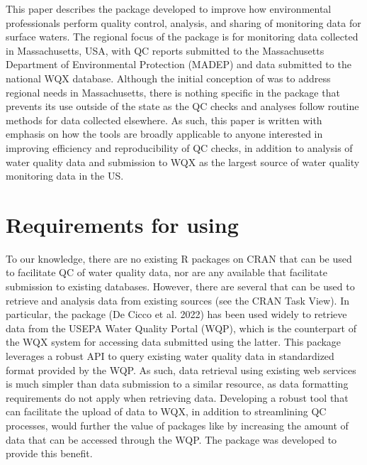 This paper describes the  package developed to improve how environmental professionals perform quality control, analysis, and sharing of monitoring data for surface waters. The regional focus of the package is for monitoring data collected in Massachusetts, USA, with QC reports submitted to the Massachusetts Department of Environmental Protection (MADEP) and data submitted to the national WQX database. Although the initial conception of  was to address regional needs in Massachusetts, there is nothing specific in the package that prevents its use outside of the state as the QC checks and analyses follow routine methods for data collected elsewhere. As such, this paper is written with emphasis on how the tools are broadly applicable to anyone interested in improving efficiency and reproducibility of QC checks, in addition to analysis of water quality data and submission to WQX as the largest source of water quality monitoring data in the US.

\hypertarget{requirements-for-using}{%
\section{\texorpdfstring{Requirements for using }{Requirements for using }}\label{requirements-for-using}}

To our knowledge, there are no existing R packages on CRAN that can be used to facilitate QC of water quality data, nor are any available that facilitate submission to existing databases. However, there are several that can be used to retrieve and analysis data from existing sources (see the CRAN  Task View). In particular, the  package (De Cicco et al. 2022) has been used widely to retrieve data from the USEPA Water Quality Portal (WQP), which is the counterpart of the WQX system for accessing data submitted using the latter. This package leverages a robust API to query existing water quality data in standardized format provided by the WQP. As such, data retrieval using existing web services is much simpler than data submission to a similar resource, as data formatting requirements do not apply when retrieving data. Developing a robust tool that can facilitate the upload of data to WQX, in addition to streamlining QC processes, would further the value of packages like  by increasing the amount of data that can be accessed through the WQP. The  package was developed to provide this benefit.

